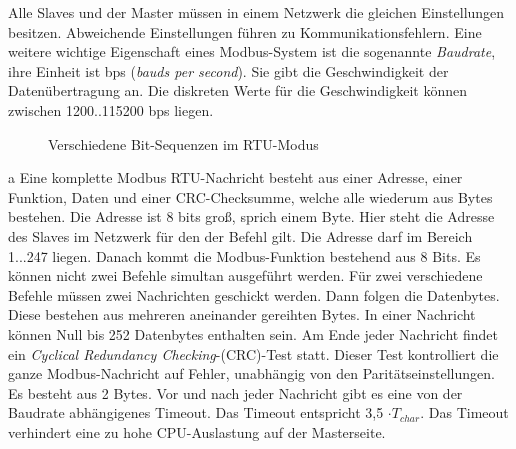Alle Slaves und der Master müssen in einem Netzwerk die gleichen Einstellungen besitzen. Abweichende Einstellungen führen zu Kommunikationsfehlern. Eine weitere wichtige Eigenschaft eines Modbus-System ist die sogenannte \textit{Baudrate}, ihre Einheit ist bps (\textit{bauds per second}). Sie gibt die Geschwindigkeit der Datenübertragung an. Die diskreten Werte für die Geschwindigkeit können zwischen 1200..115200 bps liegen. 

\begin{figure}[htb]
\centering
{}
\caption{Verschiedene Bit-Sequenzen im RTU-Modus \citep{MODBUS.ORG2002}}
\label{fig:}
\end{figure}

a
Eine komplette Modbus RTU-Nachricht besteht aus einer Adresse, einer Funktion, Daten und einer CRC-Checksumme, welche alle wiederum aus Bytes bestehen. Die Adresse ist 8 bits groß, sprich einem Byte. Hier steht die Adresse des Slaves im Netzwerk für den der Befehl gilt. Die Adresse darf im Bereich 1...247 liegen.
Danach kommt die Modbus-Funktion bestehend aus 8 Bits. Es können nicht zwei Befehle simultan ausgeführt werden. Für zwei verschiedene Befehle müssen zwei Nachrichten geschickt werden. 
Dann folgen die Datenbytes. Diese bestehen aus mehreren aneinander gereihten Bytes. In einer Nachricht können Null bis 252 Datenbytes enthalten sein. 
Am Ende jeder Nachricht findet ein \textit{Cyclical Redundancy Checking}-(CRC)-Test statt. Dieser Test kontrolliert die ganze Modbus-Nachricht auf Fehler, unabhängig von den Paritätseinstellungen. Es besteht aus 2 Bytes. 
Vor und nach jeder Nachricht gibt es eine von der Baudrate abhängigenes Timeout. Das Timeout entspricht 3,5 $\cdot T_{char}$. Das Timeout verhindert eine zu hohe CPU-Auslastung auf der Masterseite.\citep{MODBUS.ORG2002} \citep{Schleicher2005}


